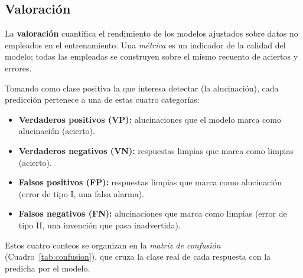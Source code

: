 \documentclass[12pt,a4paper]{report}
\theoremstyle{definition}
\begin{document}
\subsection{Valoración}

La \textbf{valoración} cuantifica el rendimiento de los modelos ajustados sobre datos no empleados en el
entrenamiento. Una \emph{métrica} es un indicador de la calidad del modelo; todas las empleadas se
construyen sobre el mismo recuento de aciertos y errores.

Tomando como clase positiva la que interesa detectar (la alucinación), cada predicción pertenece a una
de estas cuatro categorías:

\begin{itemize}
\item \textbf{Verdaderos positivos (VP):} alucinaciones que el modelo marca como alucinación (acierto).
\item \textbf{Verdaderos negativos (VN):} respuestas limpias que marca como limpias (acierto).
\item \textbf{Falsos positivos (FP):} respuestas limpias que marca como alucinación (error de tipo I,
una falsa alarma).
\item \textbf{Falsos negativos (FN):} alucinaciones que marca como limpias (error de tipo II, una
invención que pasa inadvertida).
\end{itemize}

Estos cuatro conteos se organizan en la \emph{matriz de confusión} (Cuadro~\ref{tab:confusion}), que
cruza la clase real de cada respuesta con la predicha por el modelo.
\end{document}
